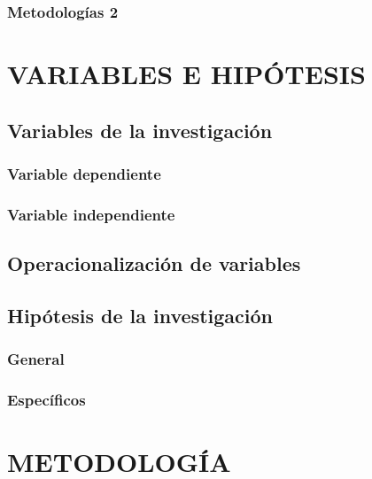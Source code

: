 \documentclass[12pt,a4paper,oneside]{book}
\begin{document}
\subsection{Metodologías 2}


\chapter{VARIABLES E HIPÓTESIS}

\section{Variables de la investigación}

\subsection{Variable dependiente}

\subsection{Variable independiente}

\section{Operacionalización de variables}

\section{Hipótesis de la investigación}

\subsection{General}

\subsection{Específicos}



\chapter{METODOLOGÍA}
\end{document}
